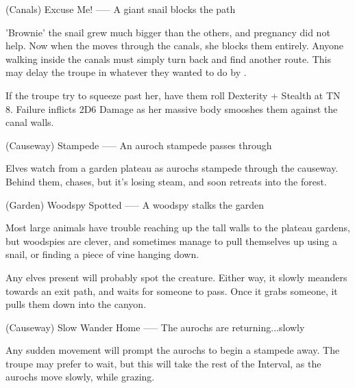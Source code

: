 (Canals) Excuse Me!
-----
{A giant snail blocks the path}

'Brownie' the snail grew much bigger than the others, and pregnancy did not help.
Now when the moves through the canals, she blocks them entirely.
Anyone walking inside the canals must simply turn back and find another route.
This may delay the troupe in whatever they wanted to do by .

If the troupe try to squeeze past her, have them roll Dexterity + Stealth at TN 8.
Failure inflicts 2D6 Damage as her massive body smooshes them against the canal walls.

(Causeway) Stampede
-----
{An auroch stampede passes through}

Elves watch from a garden plateau as aurochs stampede through the causeway.
Behind them,  chases, but it's losing steam, and soon retreats into the forest.

(Garden) Woodspy Spotted
-----
{A woodspy stalks the garden}

Most large animals have trouble reaching up the tall walls to the plateau gardens, but woodspies are clever, and sometimes manage to pull themselves up using a snail, or finding a piece of vine hanging down.

Any elves present will probably spot the creature.
Either way, it slowly meanders towards an exit path, and waits for someone to pass.
Once it grabs someone, it pulls them down into the canyon.

(Causeway) Slow Wander Home
-----
{The aurochs are returning...slowly}

Any sudden movement will prompt the aurochs to begin a stampede away.
The troupe may prefer to wait, but this will take the rest of the Interval, as the aurochs move slowly, while grazing.

